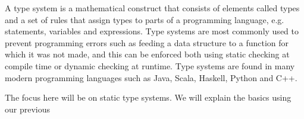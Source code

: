 
A type system is a mathematical construct that consists of elements called types
and a set of rules that assign types to parts of a programming language, e.g.
statements, variables and expressions. Type systems are most commonly used to
prevent programming errors such as feeding a data structure to a function for
which it was not made, and this can be enforced both using static checking at
compile time or dynamic checking at runtime. Type systems are found in many
modern programming languages such as Java, Scala, Haskell, Python and C++.

The focus here will be on static type systems. We will explain the basics using
our previous 



